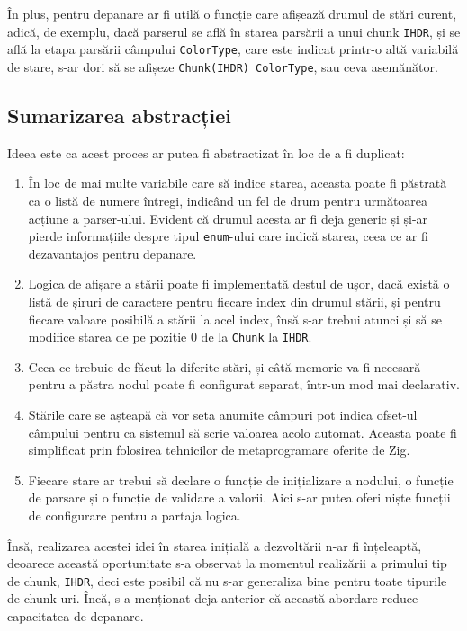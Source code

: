 \documentclass[a4paper,12pt]{report}
\begin{document}
În plus, pentru depanare ar fi utilă o funcție care afișează drumul de stări curent,
adică, de exemplu, dacă parserul se află în starea parsării a unui chunk \texttt{IHDR}, 
și se află la etapa parsării câmpului \texttt{ColorType},
care este indicat printr-o altă variabilă de stare,
s-ar dori să se afișeze \texttt{Chunk(IHDR) ColorType}, sau ceva asemănător.

\subsection{Sumarizarea abstracției}

Ideea este ca acest proces ar putea fi abstractizat în loc de a fi duplicat:
\begin{enumerate}
\item
    În loc de mai multe variabile care să indice starea, aceasta poate fi păstrată ca
    o listă de numere întregi, indicând un fel de drum pentru următoarea acțiune a parser-ului.
    Evident că drumul acesta ar fi deja generic și și-ar pierde informațiile despre tipul
    \texttt{enum}-ului care indică starea, ceea ce ar fi dezavantajos pentru depanare.
\item
    Logica de afișare a stării poate fi implementată destul de ușor, dacă există o listă de
    șiruri de caractere pentru fiecare index din drumul stării,
    și pentru fiecare valoare posibilă a stării la acel index,
    însă s-ar trebui atunci și să se modifice starea
    de pe poziție 0 de la \texttt{Chunk} la \texttt{IHDR}.
\item
    Ceea ce trebuie de făcut la diferite stări,
    și câtă memorie va fi necesară pentru a păstra nodul poate fi configurat separat,
    într-un mod mai declarativ.
\item
    Stările care se așteapă că vor seta anumite câmpuri
    pot indica ofset-ul câmpului pentru ca sistemul să scrie valoarea acolo automat.
    Aceasta poate fi simplificat prin folosirea tehnicilor de metaprogramare oferite de Zig.
\item
    Fiecare stare ar trebui să declare o funcție de inițializare a nodului,
    o funcție de parsare și o funcție de validare a valorii.
    Aici s-ar putea oferi niște funcții de configurare pentru a partaja logica.
\end{enumerate}

Însă, realizarea acestei idei în starea inițială a dezvoltării n-ar fi înțeleaptă,
deoarece această oportunitate s-a observat la momentul
realizării a primului tip de chunk, \texttt{IHDR},
deci este posibil că nu s-ar generaliza bine pentru toate tipurile de chunk-uri.
Încă, s-a menționat deja anterior că această abordare reduce capacitatea de depanare.
\end{document}
